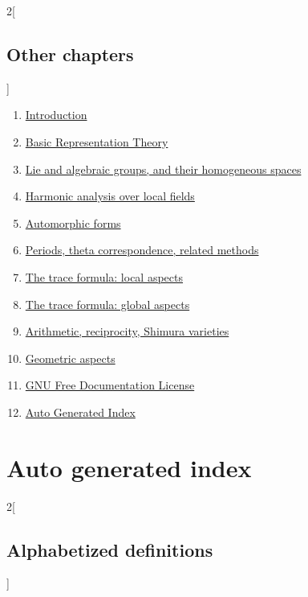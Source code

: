 \documentclass[oneside]{stacks-project-book}
\theoremstyle{plain}
\theoremstyle{definition}
\theoremstyle{remark}
\numberwithin{equation}{subsection}
\begin{document}
\begin{multicols}{2}[\section{Other chapters}]
\noindent
\begin{enumerate}
\item \hyperref[introduction-section-phantom]{Introduction}
\item \hyperref[representationtheory-section-phantom]{Basic Representation Theory}
\item \hyperref[algebraicgroups-section-phantom]{Lie and algebraic groups, and their homogeneous spaces}
\item \hyperref[harmonicanalysis-section-phantom]{Harmonic analysis over local fields}
\item \hyperref[automorphicforms-section-phantom]{Automorphic forms}
\item \hyperref[periods-section-phantom]{Periods, theta correspondence, related methods}
\item \hyperref[traceformulalocal-section-phantom]{The trace formula: local aspects}
\item \hyperref[traceformulaglobal-section-phantom]{The trace formula: global aspects}
\item \hyperref[arithmetic-section-phantom]{Arithmetic, reciprocity, Shimura varieties}
\item \hyperref[geometric-section-phantom]{Geometric aspects}
\item \hyperref[fdl-section-phantom]{GNU Free Documentation License}
\item \hyperref[index-section-phantom]{Auto Generated Index}
\end{enumerate}
\end{multicols}
\chapter{Auto generated index}

\label{index-section-phantom}


\frenchspacing


\begin{multicols}{2}[\section{Alphabetized definitions}\label{index-section-alphabetized}]
\end{multicols}
\end{document}
